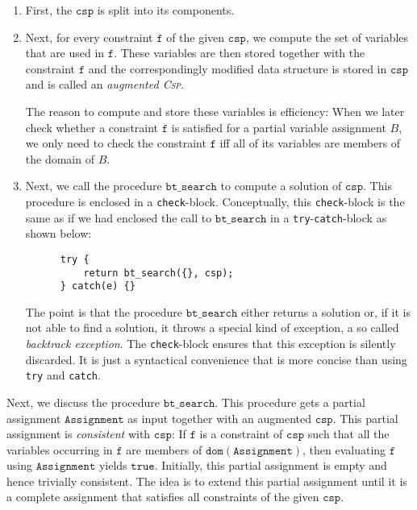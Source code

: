 \begin{enumerate}
\item First, the $\mathtt{csp}$ is split into its components.
\item Next, for every constraint $\mathtt{f}$ of the given $\mathtt{csp}$, we compute the set of variables that
      are used in $\mathtt{f}$.  These variables are then stored together with the constraint $\mathtt{f}$ and
      the correspondingly modified data structure is stored in $\mathtt{csp}$ and is called an
      \emph{\color{blue}augmented \textsc{Csp}}.

      The reason to compute and store these variables is efficiency: When we later check whether a constraint $\mathtt{f}$
      is satisfied for a partial variable assignment $B$, we only need to check the constraint $\mathtt{f}$ iff all
      of its variables are members of the domain of $B$.
\item Next, we call the procedure $\mathtt{bt\_search}$ to compute a solution of $\mathtt{csp}$.
      This procedure is enclosed in a \texttt{check}-block.  Conceptually, this \texttt{check}-block is the
      same as if we had enclosed the call to $\mathtt{bt\_search}$ in a \texttt{try}-\texttt{catch}-block as
      shown below:
\begin{verbatim}
      try {
          return bt_search({}, csp);
      } catch(e) {}
\end{verbatim}
     The point is that the procedure $\mathtt{bt\_search}$ either returns a solution or, if it is not able to
     find a solution, it throws a special kind of exception, a so called \emph{\color{blue}backtrack exception}.
     The \texttt{check}-block ensures that this exception is silently discarded.  It is just a syntactical
     convenience that is more concise than using \texttt{try} and \texttt{catch}.
\end{enumerate}
Next, we discuss the procedure $\mathtt{bt\_search}$.  This procedure gets a partial assignment
$\mathtt{Assignment}$ as input together with an augmented $\mathtt{csp}$.  This partial assignment is
\emph{\color{blue}consistent} with $\mathtt{csp}$:  If $\mathtt{f}$ is a constraint of $\mathtt{csp}$ such that
all the variables occurring in $\mathtt{f}$ are members of $\mathtt{dom}(\mathtt{Assignment})$, then evaluating
$\mathtt{f}$ using $\mathtt{Assignment}$ yields $\mathtt{true}$.  Initially, this partial assignment is empty
and hence trivially consistent.  The idea is to extend this partial assignment until it is a complete
assignment that satisfies all constraints of the given $\mathtt{csp}$.
